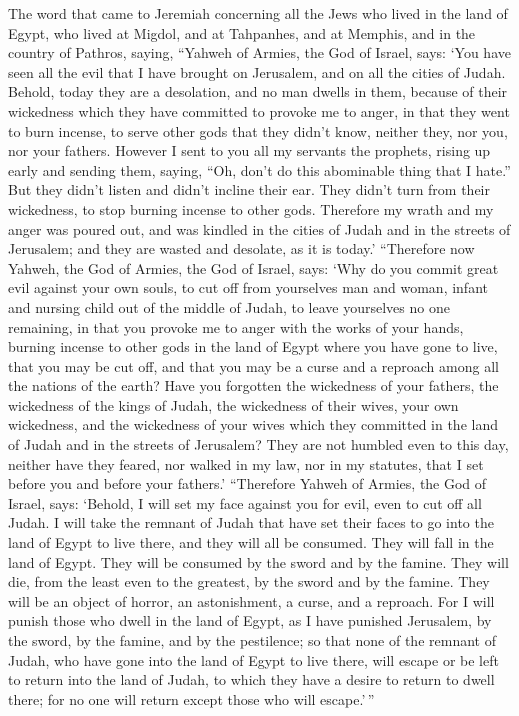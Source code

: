  The word that came to Jeremiah concerning all the Jews
who lived in the land of Egypt, who lived at Migdol, and at Tahpanhes,
and at Memphis, and in the country of Pathros, saying, 
``Yahweh of Armies, the God of Israel, says: `You have seen all the evil
that I have brought on Jerusalem, and on all the cities of Judah.
Behold, today they are a desolation, and no man dwells in them,
 because of their wickedness which they have committed to
provoke me to anger, in that they went to burn incense, to serve other
gods that they didn't know, neither they, nor you, nor your fathers.
 However I sent to you all my servants the prophets,
rising up early and sending them, saying, ``Oh, don't do this abominable
thing that I hate.''  But they didn't listen and didn't
incline their ear. They didn't turn from their wickedness, to stop
burning incense to other gods.  Therefore my wrath and my
anger was poured out, and was kindled in the cities of Judah and in the
streets of Jerusalem; and they are wasted and desolate, as it is today.'
 ``Therefore now Yahweh, the God of Armies, the God of
Israel, says: `Why do you commit great evil against your own souls, to
cut off from yourselves man and woman, infant and nursing child out of
the middle of Judah, to leave yourselves no one remaining,
 in that you provoke me to anger with the works of your
hands, burning incense to other gods in the land of Egypt where you have
gone to live, that you may be cut off, and that you may be a curse and a
reproach among all the nations of the earth?  Have you
forgotten the wickedness of your fathers, the wickedness of the kings of
Judah, the wickedness of their wives, your own wickedness, and the
wickedness of your wives which they committed in the land of Judah and
in the streets of Jerusalem?  They are not humbled even
to this day, neither have they feared, nor walked in my law, nor in my
statutes, that I set before you and before your fathers.'
 ``Therefore Yahweh of Armies, the God of Israel, says:
`Behold, I will set my face against you for evil, even to cut off all
Judah.  I will take the remnant of Judah that have set
their faces to go into the land of Egypt to live there, and they will
all be consumed. They will fall in the land of Egypt. They will be
consumed by the sword and by the famine. They will die, from the least
even to the greatest, by the sword and by the famine. They will be an
object of horror, an astonishment, a curse, and a reproach.
 For I will punish those who dwell in the land of Egypt,
as I have punished Jerusalem, by the sword, by the famine, and by the
pestilence;  so that none of the remnant of Judah, who
have gone into the land of Egypt to live there, will escape or be left
to return into the land of Judah, to which they have a desire to return
to dwell there; for no one will return except those who will
escape.'\,''

